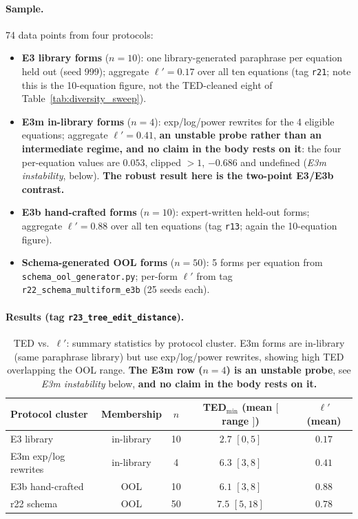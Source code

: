 \paragraph{Sample.} 74 data points from four protocols:
\begin{itemize}[nosep]
\item \textbf{E3 library forms} ($n{=}10$): one library-generated paraphrase per equation held out (seed 999); aggregate $\ell'{=}0.17$ over all ten equations (tag \texttt{r21}; note this is the 10-equation figure, not the TED-cleaned eight of Table~\ref{tab:diversity_sweep}).
\item \textbf{E3m in-library forms} ($n{=}4$): exp/log/power rewrites for the 4 eligible equations; aggregate $\ell'{=}0.41$, \textbf{an unstable probe rather than an intermediate regime, and no claim in the body rests on it}: the four per-equation values are $0.053$, clipped ${>}1$, $-0.686$ and undefined (\emph{E3m instability}, below). \textbf{The robust result here is the two-point E3/E3b contrast.}
\item \textbf{E3b hand-crafted forms} ($n{=}10$): expert-written held-out forms; aggregate $\ell'{=}0.88$ over all ten equations (tag \texttt{r13}; again the 10-equation figure).
\item \textbf{Schema-generated OOL forms} ($n{=}50$): 5 forms per equation from \texttt{schema\_ool\_generator.py}; per-form $\ell'$ from tag \texttt{r22\_schema\_multiform\_e3b} (25 seeds each).
\end{itemize}

\paragraph{Results (tag \texttt{r23\_tree\_edit\_distance}).}

\begin{table}[h]
\centering
\small
\caption{TED vs.\ $\ell'$: summary statistics by protocol cluster. E3m forms are in-library (same paraphrase library) but use exp/log/power rewrites, showing high TED overlapping the OOL range. \textbf{The E3m row ($n{=}4$) is an unstable probe}, see \emph{E3m instability} below, \textbf{and no claim in the body rests on it.}}
\label{tab:ted_summary}
\begin{tabular}{lcccc}
\toprule
Protocol cluster & Membership & $n$ & TED$_{\min}$ (mean $[$ range $]$) & $\ell'$ (mean) \\
\midrule
E3 library & in-library & 10 & $2.7$ $[0, 5]$ & $0.17$ \\
E3m exp/log rewrites & in-library & 4 & $6.3$ $[3, 8]$ & $0.41$ \\
E3b hand-crafted & OOL & 10 & $6.1$ $[3, 8]$ & $0.88$ \\
r22 schema & OOL & 50 & $7.5$ $[5, 18]$ & $0.78$ \\
\bottomrule
\end{tabular}
\end{table}

